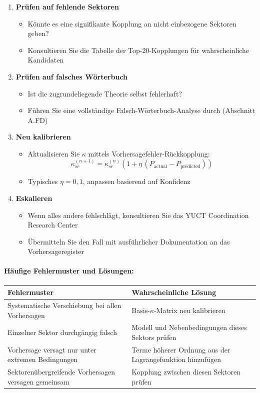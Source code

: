 \documentclass[13pt,a4paper]{article}
\begin{document}
\begin{enumerate}
		\item \textbf{Prüfen auf fehlende Sektoren}
		\begin{itemize}
			\item Könnte es eine signifikante Kopplung an nicht einbezogene Sektoren geben?
			\item Konsultieren Sie die Tabelle der Top-20-Kopplungen für wahrscheinliche Kandidaten
		\end{itemize}
		
		\item \textbf{Prüfen auf falsches Wörterbuch}
		\begin{itemize}
			\item Ist die zugrundeliegende Theorie selbst fehlerhaft?
			\item Führen Sie eine vollständige Falsch-Wörterbuch-Analyse durch (Abschnitt A.FD)
		\end{itemize}
		
		\item \textbf{Neu kalibrieren}
		\begin{itemize}
			\item Aktualisieren Sie $\kappa$ mittels Vorhersagefehler-Rückkopplung:
			\[ \kappa_{sr}^{(n+1)} = \kappa_{sr}^{(n)}\left(1+\eta\,(P_{\mathrm{actual}}-P_{\mathrm{predicted}})\right) \]
			\item Typisches $\eta = 0,1$, anpassen basierend auf Konfidenz
		\end{itemize}
		
		\item \textbf{Eskalieren}
		\begin{itemize}
			\item Wenn alles andere fehlschlägt, konsultieren Sie das YUCT Coordination Research Center
			\item Übermitteln Sie den Fall mit ausführlicher Dokumentation an das Vorhersageregister
		\end{itemize}
	\end{enumerate}
	
	\paragraph*{Häufige Fehlermuster und Lösungen:}
	
	\begin{tabularx}{\textwidth}{|l|X|}
		\hline
		\textbf{Fehlermuster} & \textbf{Wahrscheinliche Lösung} \\
		\hline
		Systematische Verschiebung bei allen Vorhersagen & Basis-$\kappa$-Matrix neu kalibrieren \\
		\hline
		Einzelner Sektor durchgängig falsch & Modell und Nebenbedingungen dieses Sektors prüfen \\
		\hline
		Vorhersage versagt nur unter extremen Bedingungen & Terme höherer Ordnung aus der Lagrangefunktion hinzufügen \\
		\hline
		Sektorenübergreifende Vorhersagen versagen gemeinsam & Kopplung zwischen diesen Sektoren prüfen \\
		\hline
	\end{tabularx}
	
\end{document}
